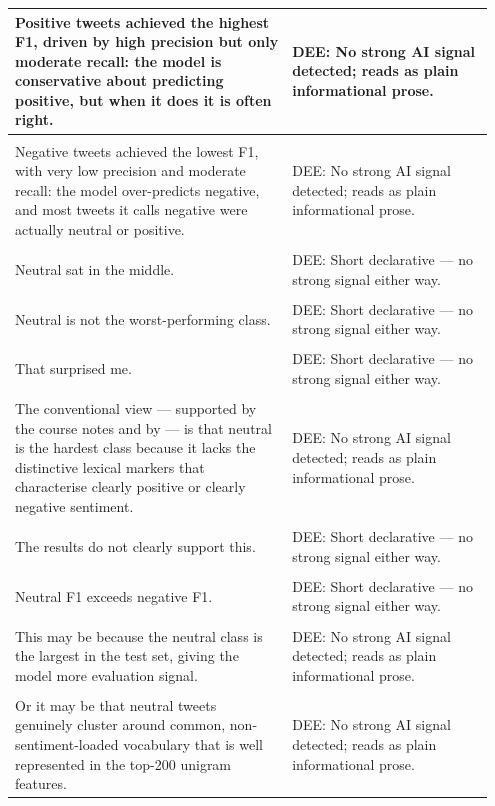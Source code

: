 \documentclass[11pt]{article}
\begin{document}
\begin{longtable}{|p{0.55\linewidth}|p{0.40\linewidth}|}
\hline
Positive tweets achieved the highest F1, driven by high precision but only moderate recall: the model is conservative about predicting positive, but when it does it is often right. & DEE: No strong AI signal detected; reads as plain informational prose. \\[2pt]
\hline
\rule{0pt}{3.5cm} & \\
\hline
Negative tweets achieved the lowest F1, with very low precision and moderate recall: the model over-predicts negative, and most tweets it calls negative were actually neutral or positive. & DEE: No strong AI signal detected; reads as plain informational prose. \\[2pt]
\hline
\rule{0pt}{3.5cm} & \\
\hline
Neutral sat in the middle. & DEE: Short declarative --- no strong signal either way. \\[2pt]
\hline
\rule{0pt}{3.5cm} & \\
\hline
Neutral is not the worst-performing class. & DEE: Short declarative --- no strong signal either way. \\[2pt]
\hline
\rule{0pt}{3.5cm} & \\
\hline
That surprised me. & DEE: Short declarative --- no strong signal either way. \\[2pt]
\hline
\rule{0pt}{3.5cm} & \\
\hline
The conventional view --- supported by the course notes and by --- is that neutral is the hardest class because it lacks the distinctive lexical markers that characterise clearly positive or clearly negative sentiment. & DEE: No strong AI signal detected; reads as plain informational prose. \\[2pt]
\hline
\rule{0pt}{3.5cm} & \\
\hline
The results do not clearly support this. & DEE: Short declarative --- no strong signal either way. \\[2pt]
\hline
\rule{0pt}{3.5cm} & \\
\hline
Neutral F1 exceeds negative F1. & DEE: Short declarative --- no strong signal either way. \\[2pt]
\hline
\rule{0pt}{3.5cm} & \\
\hline
This may be because the neutral class is the largest in the test set, giving the model more evaluation signal. & DEE: No strong AI signal detected; reads as plain informational prose. \\[2pt]
\hline
\rule{0pt}{3.5cm} & \\
\hline
Or it may be that neutral tweets genuinely cluster around common, non-sentiment-loaded vocabulary that is well represented in the top-200 unigram features. & DEE: No strong AI signal detected; reads as plain informational prose. \\[2pt]

\end{longtable}
\end{document}
